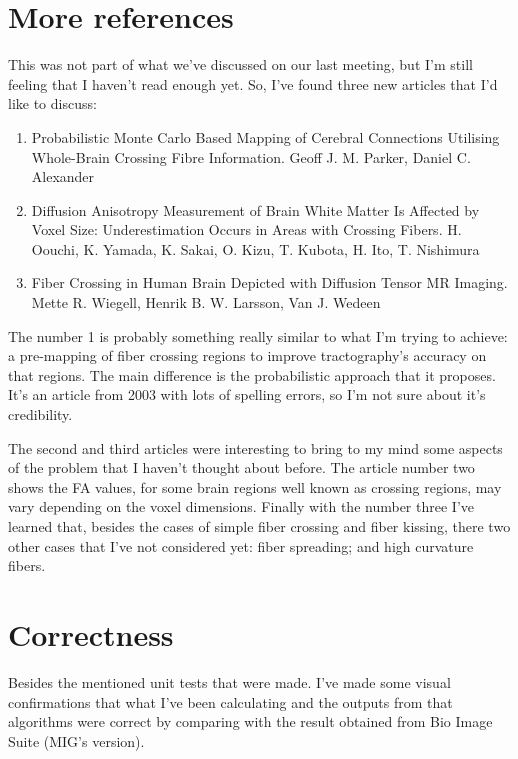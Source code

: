 \documentclass[a4paper,11pt]{report}
\begin{document}
  \section{More references}\label{sec:more-references}
  This was not part of what we've discussed on our last meeting, but I'm still feeling that I haven't read enough yet. So, I've found three new articles that I'd like to discuss:

  \begin{enumerate}
    \item Probabilistic Monte Carlo Based Mapping of Cerebral Connections Utilising Whole-Brain Crossing Fibre Information. Geoff J. M. Parker, Daniel C. Alexander
    \item Diffusion Anisotropy Measurement of Brain White Matter Is Affected by Voxel Size: Underestimation Occurs in Areas with Crossing Fibers. H. Oouchi, K. Yamada, K. Sakai, O. Kizu, T. Kubota, H. Ito, T. Nishimura
    \item Fiber Crossing in Human Brain Depicted with Diffusion Tensor MR Imaging. Mette R. Wiegell, Henrik B. W. Larsson, Van J. Wedeen
  \end{enumerate}

  The number 1 is probably something really similar to what I'm trying to achieve: a pre-mapping of fiber crossing regions to improve tractography's accuracy on that regions. The main difference is the probabilistic approach that it proposes. It's an article from 2003 with lots of spelling errors, so I'm not sure about it's credibility.

  The second and third articles were interesting to bring to my mind some aspects of the problem that I haven't thought about before. The article number two shows the FA values, for some brain regions well known as crossing regions, may vary depending on the voxel dimensions. Finally with the number three I've learned that, besides the cases of simple fiber crossing and fiber kissing, there two other cases that I've not considered yet: fiber spreading; and high curvature fibers.

  \section{Correctness}
  Besides the mentioned unit tests that were made. I've made some visual confirmations that what I've been calculating and the outputs from that algorithms were correct by comparing with the result obtained from Bio Image Suite (MIG's version).
\end{document}
